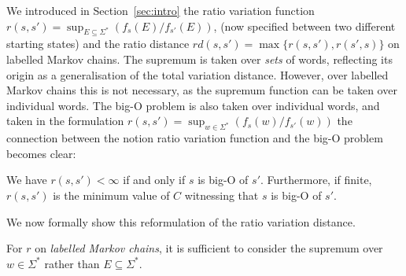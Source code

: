 \documentclass{lmcs}
\theoremstyle{plain}
\theoremstyle{definition}
\theoremstyle{remark}
\newcommand\tvra{\mathit{r}}
\newcommand\tvrs{\mathit{rd}}
\begin{document}
We introduced in Section~\ref{sec:intro} the ratio variation function $\tvra(s,s') = \sup_{E \subseteq \Sigma^*} (f_{s}(E) / f_{s'}(E))$, (now specified between two different starting states) and the ratio distance $\tvrs(s,s') = \max\{\tvra(s,s') ,\tvra(s',s) \}$ on labelled Markov chains.
The supremum is taken over \emph{sets} of words, reflecting its origin as a generalisation of the total variation distance. However, over labelled Markov chains this is not necessary, as the supremum function can be taken over individual words. The big-O problem is also taken over individual words, and taken in the formulation  $\tvra(s,s') = \sup_{w \in \Sigma^*} (f_{s}(w) / f_{s'}(w))$ the connection between the notion ratio variation function and the big-O problem becomes clear: \begin{obs}
  \label{obs:bigorvd} We have 
  $\tvra(s,s')< \infty$ if and only if $s$ is big-O of $s'$. Furthermore, if finite, $\tvra(s,s')$ is the minimum value of $C$ witnessing that $s$ is big-O of $s'$.\end{obs} We now formally show this reformulation of the ratio variation distance.

\begin{prop} \label{prop:simplifytvrasa}
For $\tvra$ on \textit{labelled Markov chains},  it is sufficient to consider the supremum over  $w\in \Sigma^*$ rather than $E\subseteq \Sigma^*$.\end{prop}
\end{document}
